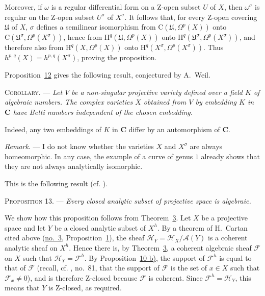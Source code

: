 Moreover, if $\omega$ is a regular differential form on a Z-open subset $U$
of $X$, then $\omega^\sigma$ is regular on the Z-open subset $U^\sigma$ of
$X^\sigma$. It follows that, for every Z-open covering $\mathfrak{U}$ of $X$,
$\sigma$ defines a semilinear isomorphism from
$\mathrm{C}(\mathfrak{U},\Omega^p(X))$ onto
$\mathrm{C}(\mathfrak{U}^\sigma,\Omega^p(X^\sigma))$, hence from
$\mathrm{H}^q(\mathfrak{U},\Omega^p(X))$ onto
$\mathrm{H}^q(\mathfrak{U}^\sigma,\Omega^p(X^\sigma))$, and therefore also
from $\mathrm{H}^q(X,\Omega^p(X))$ onto
$\mathrm{H}^q(X^\sigma,\Omega^p(X^\sigma))$. Thus
$h^{p,q}(X)=h^{p,q}(X^\sigma)$, proving the proposition.

Proposition~\hyperref[gaga:prop:12]{12} gives the following result, conjectured
by A.~Weil.

\textsc{Corollary}. --- \emph{Let $V$ be a
non-singular projective variety defined over a field $K$ of algebraic numbers.
The complex varieties $X$ obtained from $V$ by embedding $K$ in $\mathbf{C}$
have Betti numbers independent of the chosen embedding.}

Indeed, any two embeddings of $K$ in $\mathbf{C}$ differ by an automorphism of
$\mathbf{C}$.

\emph{Remark}. --- I do not know whether the
varieties $X$ and $X^\sigma$ are always homeomorphic. In any case, the example
of a curve of genus $1$ already shows that they are not always analytically
isomorphic.


This is the following result (cf. ).

\textsc{Proposition 13}. --- \emph{Every closed
analytic subset of projective space is algebraic.}

We show how this proposition follows from Theorem~\hyperref[gaga:thm:3]{3}.
Let $X$ be a projective space and let $Y$ be a closed analytic subset of
$X^h$. By a theorem of H.~Cartan cited above
(\hyperref[gaga:no:3]{no.~3}, Proposition~\hyperref[gaga:prop:1]{1}), the sheaf
$\mathcal{H}_Y=\mathcal{H}_X/\mathcal{A}(Y)$ is a coherent analytic sheaf on
$X^h$. Hence there is, by Theorem~\hyperref[gaga:thm:3]{3}, a coherent
algebraic sheaf $\mathcal{F}$ on $X$ such that
$\mathcal{H}_Y=\mathcal{F}^h$. By Proposition~\hyperref[gaga:prop:10:item:b]{10
b)}, the support of $\mathcal{F}^h$ is equal to that of $\mathcal{F}$ (recall,
cf. , no.~81, that the support of $\mathcal{F}$ is the set of $x\in X$
such that $\mathcal{F}_x\ne0$), and is therefore Z-closed because
$\mathcal{F}$ is coherent. Since $\mathcal{F}^h=\mathcal{H}_Y$, this means that
$Y$ is Z-closed, as required.

